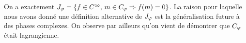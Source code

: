 On a exactement $J_{\varphi}=\{f \in C^{\infty},\, m \in C_{\varphi}\Rightarrow f(m)=0\}$. La raison pour laquelle nous avons donné une définition alternative de $J_{\varphi}$ est la généralisation future à des phases complexes. On observe par ailleurs qu'on vient de démontrer que $C_{\varphi}$ était lagrangienne.
